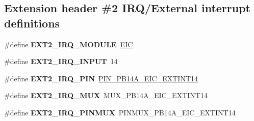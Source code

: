 \subsection*{Extension header \#2 I\+R\+Q/\+External interrupt definitions}
\begin{DoxyCompactItemize}
\item 
\hypertarget{group__saml21__xplained__pro__features__group_ga9c7d09aeb7bba32ec8bca4f14d66a70c}{}\#define {\bfseries E\+X\+T2\+\_\+\+I\+R\+Q\+\_\+\+M\+O\+D\+U\+L\+E}~\hyperlink{group___s_a_m_l21_j18_a__base_ga27183a94584b5fca7e1207ce7a79782a}{E\+I\+C}\label{group__saml21__xplained__pro__features__group_ga9c7d09aeb7bba32ec8bca4f14d66a70c}

\item 
\hypertarget{group__saml21__xplained__pro__features__group_gabab814617e9251dc70998b42ed7cdb4f}{}\#define {\bfseries E\+X\+T2\+\_\+\+I\+R\+Q\+\_\+\+I\+N\+P\+U\+T}~14\label{group__saml21__xplained__pro__features__group_gabab814617e9251dc70998b42ed7cdb4f}

\item 
\hypertarget{group__saml21__xplained__pro__features__group_ga463f0f401aa67ecec8d09529eca77a68}{}\#define {\bfseries E\+X\+T2\+\_\+\+I\+R\+Q\+\_\+\+P\+I\+N}~\hyperlink{pio_2saml21j18a_8h_a97b02a75f517744286a792170b1b7007}{P\+I\+N\+\_\+\+P\+B14\+A\+\_\+\+E\+I\+C\+\_\+\+E\+X\+T\+I\+N\+T14}\label{group__saml21__xplained__pro__features__group_ga463f0f401aa67ecec8d09529eca77a68}

\item 
\hypertarget{group__saml21__xplained__pro__features__group_ga4bb40e6d553d9016fbd69f3ccc79ebc0}{}\#define {\bfseries E\+X\+T2\+\_\+\+I\+R\+Q\+\_\+\+M\+U\+X}~M\+U\+X\+\_\+\+P\+B14\+A\+\_\+\+E\+I\+C\+\_\+\+E\+X\+T\+I\+N\+T14\label{group__saml21__xplained__pro__features__group_ga4bb40e6d553d9016fbd69f3ccc79ebc0}

\item 
\hypertarget{group__saml21__xplained__pro__features__group_ga30035ae80991aa23f39da81428529ac4}{}\#define {\bfseries E\+X\+T2\+\_\+\+I\+R\+Q\+\_\+\+P\+I\+N\+M\+U\+X}~P\+I\+N\+M\+U\+X\+\_\+\+P\+B14\+A\+\_\+\+E\+I\+C\+\_\+\+E\+X\+T\+I\+N\+T14\label{group__saml21__xplained__pro__features__group_ga30035ae80991aa23f39da81428529ac4}

\end{DoxyCompactItemize}
